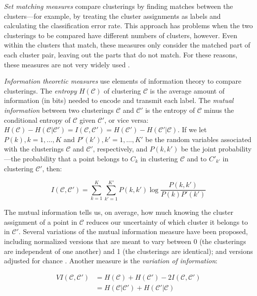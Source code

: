 \emph{Set matching measures} compare clusterings by finding matches
between the clusters---for example, by treating the cluster assignments
as labels and calculating the classification error rate. This approach
has problems when the two clusterings to be compared have different
numbers of clusters, however. Even within the clusters that match, these
measures only consider the matched part of each cluster pair, leaving
out the parts that do not match. For these reasons, these measures are
not very widely used
\autocites{meila_comparing_2007}{vinh_information_2010}.

\emph{Information theoretic measures} use elements of information theory
to compare clusterings. The \emph{entropy} \(H(\mathcal{C})\) of
clustering \(\mathcal{C}\) is the average amount of information (in
bits) needed to encode and transmit each label. The \emph{mutual
information} between two clusterings \(\mathcal{C}\) and
\(\mathcal{C'}\) is the entropy of \(\mathcal{C}\) minus the conditional
entropy of \(\mathcal{C}\) given \(\mathcal{C'}\), or vice versa:
\(H(\mathcal{C}) - H(\mathcal{C}|\mathcal{C'}) = I(\mathcal{C}, \mathcal{C'}) = H(\mathcal{C'}) - H(\mathcal{C'}|\mathcal{C})\).
If we let \(P(k), k = 1, \ldots, K\) and \(P'(k'), k' = 1, \ldots, K'\)
be the random variables associated with the clusterings \(\mathcal{C}\)
and \(\mathcal{C'}\), respectively, and \(P(k, k')\) be the joint
probability---the probability that a point belongs to \(C_k\) in
clustering \(\mathcal{C}\) and to \(C'_{k'}\) in clustering
\(\mathcal{C'}\), then:

\[I(\mathcal{C}, \mathcal{C'}) = \sum_{k=1}^{K} \sum_{k'=1}^{K'} P(k, k') \log \frac{P(k, k')}{P(k) P'(k')}\]

The mutual information tells us, on average, how much knowing the
cluster assignment of a point in \(\mathcal{C}\) reduces our uncertainty
of which cluster it belongs to in \(\mathcal{C'}\). Several variations
of the mutual information measure have been proposed, including
normalized versions that are meant to vary between 0 (the clusterings
are independent of one another) and 1 (the clusterings are identical);
and versions adjusted for chance \autocite{vinh_information_2010}.
Another measure is the \emph{variation of information}:

\[
\begin{aligned}
VI(\mathcal{C}, \mathcal{C'}) &= H(\mathcal{C}) + H(\mathcal{C'}) - 2I(\mathcal{C}, \mathcal{C'}) \\
                                                            &= H(\mathcal{C}|\mathcal{C'}) + H(\mathcal{C'}|\mathcal{C})
\end{aligned}
\]

